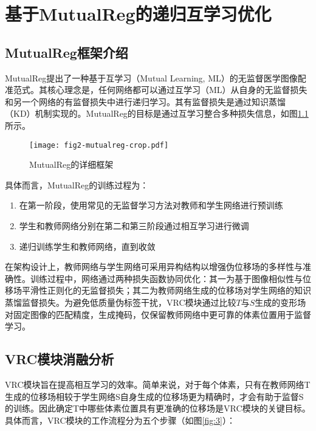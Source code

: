 \chapter{基于MutualReg的递归互学习优化}

\section{MutualReg框架介绍}

MutualReg\cite{liu2024mutualreg}提出了一种基于互学习（Mutual Learning, ML）的无监督医学图像配准范式。其核心理念是，任何网络都可以通过互学习（ML）从自身的无监督损失和另一个网络的有监督损失中进行递归学习。其有监督损失是通过知识蒸馏（KD）机制实现的。MutualReg的目标是通过互学习整合多种损失信息，如图\ref{fig:2}所示。

\begin{figure}[h]
    \centering
    \texttt{[image: fig2-mutualreg-crop.pdf]}
    \caption{MutualReg的详细框架}
    \label{fig:2}
\end{figure}

具体而言，MutualReg的训练过程为：

\begin{enumerate}
    \item 在第一阶段，使用常见的无监督学习方法对教师和学生网络进行预训练
    \item 学生和教师网络分别在第二和第三阶段通过相互学习进行微调
    \item 递归训练学生和教师网络，直到收敛
\end{enumerate}

在架构设计上，教师网络与学生网络可采用异构结构以增强伪位移场的多样性与准确性。训练过程中，网络通过两种损失函数协同优化：其一为基于图像相似性与位移场平滑性正则化的无监督损失；其二为教师网络生成的位移场对学生网络的知识蒸馏监督损失。为避免低质量伪标签干扰，VRC模块通过比较$T$与$S$生成的变形场对固定图像的匹配精度，生成掩码，仅保留教师网络中更可靠的体素位置用于监督学习。

\section{VRC模块消融分析}



VRC模块旨在提高相互学习的效率。简单来说，对于每个体素，只有在教师网络T生成的位移场相较于学生网络S自身生成的位移场更为精确时，才会有助于监督S的训练。因此确定T中哪些体素位置具有更准确的位移场是VRC模块的关键目标。具体而言，VRC模块的工作流程分为五个步骤（如图\ref{fig:3}）：

